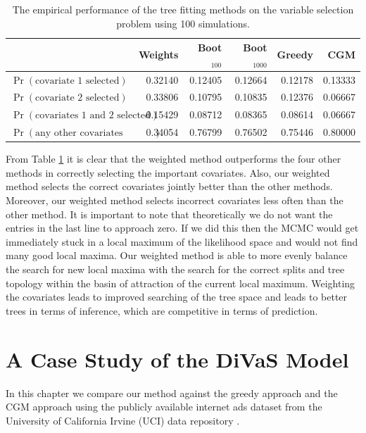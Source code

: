 
\begin{table}[ht]
\begin{center}
\begin{tabular}{l | rrrrr}
  \hline
  & Weights & Boot$_{100}$ & Boot$_{1000}$ & Greedy & CGM \\ 
  \hline
$\Pr(\text{covariate 1 selected})$ & 0.32140 & 0.12405 & 0.12664 & 0.12178 & 0.13333 \\ 
$\Pr(\text{covariate 2 selected})$ & 0.33806 & 0.10795 & 0.10835 & 0.12376 & 0.06667 \\ 
  $\Pr(\text{covariates 1 and 2 selected})$& 0.15429 & 0.08712 & 0.08365 & 0.08614 & 0.06667 \\ 
  $\Pr(\text{any other covariates  selected})$ & 0.34054 & 0.76799 & 0.76502 & 0.75446 & 0.80000 \\ 
   \hline
\end{tabular}
 \caption[Empirical covariate selection with 100 simulations.]{The empirical performance of the tree fitting methods on the variable selection problem using 100 simulations.}
 \label{tab:sim_study}
 \end{center}
\end{table}


From Table \ref{tab:sim_study} it is clear that the weighted method outperforms the four other methods in correctly selecting the important covariates. Also, our weighted method selects the correct covariates jointly better than the other methods. Moreover, our weighted method selects incorrect covariates less often than the other method. It is important to note that theoretically we do not want the entries in the last line to approach zero. If we did this then the MCMC would get immediately stuck in a local maximum of the likelihood space and would not find many good local maxima. Our weighted method is able to more evenly balance the search for new local maxima with the search for the correct splits and tree topology within the basin of attraction of the current local maximum. Weighting the covariates leads to improved searching of the tree space and leads to better trees in terms of inference, which are competitive in terms of prediction.  

\newpage

\chapter{A Case Study of the DiVaS Model}\label{sec:real_data}
In this chapter we compare our method against the greedy approach and the CGM approach using the publicly available internet ads dataset from the University of California Irvine (UCI) data repository \cite{Frank:2010uq}. 

